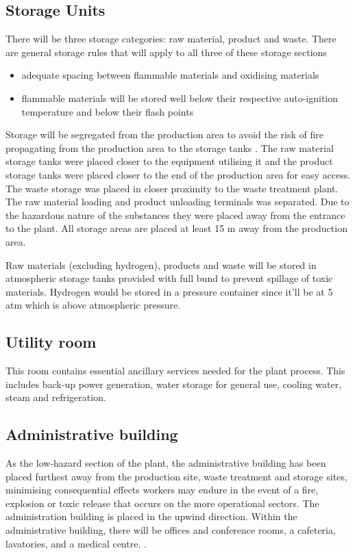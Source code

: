 \subsection{Storage Units}

There will be three storage categories: raw material, product and waste. There are general storage rules that will apply to all three of these storage sections 

\begin{itemize}
    \item adequate spacing between flammable materials and oxidising materials 
    \item flammable materials will be stored well below their respective auto-ignition temperature and below their flash points
\end{itemize}

Storage will be segregated from the production area to avoid the risk of fire propagating from the production area to the storage tanks \cite{mannan_lees_2012}. The raw material storage tanks were placed closer to the equipment utilising it and the product storage tanks were placed closer to the end of the production area for easy access. The waste storage was placed in closer proximity to the waste treatment plant. The raw material loading and product unloading terminals was separated. Due to the hazardous nature of the substances they were placed away from the entrance to the plant. All storage areas are placed at least 15 m away from the production area. 

Raw materials (excluding hydrogen), products and waste will be stored in atmospheric storage tanks provided with full bund to prevent spillage of toxic materials. Hydrogen would be stored in a pressure container since it'll be at 5 atm which is above atmospheric pressure.


\subsection{Utility room}
This room contains essential ancillary services needed for the plant process. This includes back-up power generation, water storage for general use, cooling water, steam and refrigeration. 

\subsection{Administrative building}

As the low-hazard section of the plant, the administrative building has been placed furthest away from the production site, waste treatment and storage sites, minimising  consequential effects workers may endure in the event of a fire, explosion or toxic release that occurs on the more operational sectors. The administration building is placed in the upwind direction. Within the administrative building, there will be offices and conference rooms, a cafeteria, lavatories, and a medical centre. \cite{sinnott_coulson_2005}. 


